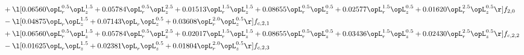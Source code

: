 \begin{alignat}{2}
& + \l[  0.06560 \opL_r^{0.5} \opL_z^{1.5} +  0.05784 \opL_r^{0.5} \opL_z^{2.5} +  0.01513 \opL_r^{1.5} \opL_z^{1.5} +  0.08655 \opL_r^{0.5} \opL_z^{0.5} +  0.02577 \opL_r^{1.5} \opL_z^{0.5} +  0.01620 \opL_r^{2.5} \opL_z^{0.5}  \r] f_{2,0} \nonumber \\ 
& - \l[  0.04875 \opL_r \opL_z^{1.5} +  0.07143 \opL_r \opL_z^{0.5} +  0.03608 \opL_r^{2.0} \opL_z^{0.5}  \r] f_{c,2,1} \nonumber \\ 
& + \l[  0.06560 \opL_r^{0.5} \opL_z^{1.5} +  0.05784 \opL_r^{0.5} \opL_z^{2.5} +  0.02017 \opL_r^{1.5} \opL_z^{1.5} +  0.08655 \opL_r^{0.5} \opL_z^{0.5} +  0.03436 \opL_r^{1.5} \opL_z^{0.5} +  0.02430 \opL_r^{2.5} \opL_z^{0.5}  \r] f_{c,2,2} \nonumber \\ 
& - \l[  0.01625 \opL_r \opL_z^{1.5} +  0.02381 \opL_r \opL_z^{0.5} +  0.01804 \opL_r^{2.0} \opL_z^{0.5}  \r] f_{c,2,3} \nonumber \\ 
\end{alignat} 


